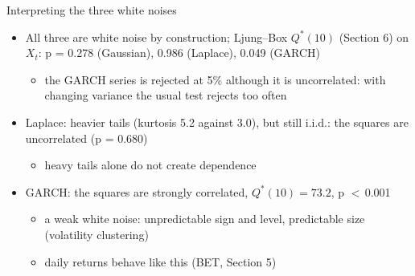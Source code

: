 \begin{frame}{Interpreting the three white noises}
\itemsize{\small}
\begin{itemize}
    \item All three are white noise by construction; Ljung--Box $Q^*(10)$ (Section 6) on $X_t$: p = 0.278 (Gaussian), 0.986 (Laplace), 0.049 (GARCH)
    \begin{itemize}
        \item the GARCH series is rejected at 5\% although it is uncorrelated: with changing variance the usual test rejects too often
    \end{itemize}
    \item Laplace: heavier tails (kurtosis 5.2 against 3.0), but still i.i.d.: the squares are uncorrelated (p = 0.680)
    \begin{itemize}
        \item heavy tails alone do not create dependence
    \end{itemize}
    \item GARCH: the squares are strongly correlated, $Q^*(10) = 73.2$, p $<$\,0.001
    \begin{itemize}
        \item a weak white noise: unpredictable sign and level, predictable size (volatility clustering)
        \item daily returns behave like this (BET, Section 5)
    \end{itemize}
\end{itemize}
\end{frame}

